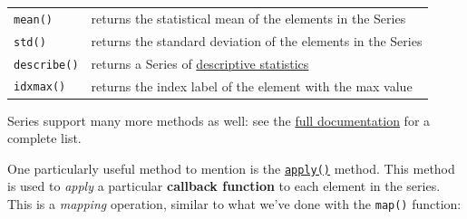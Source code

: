 \documentclass[]{book}
\begin{document}
\begin{longtable}[]{@{}ll@{}}
\begin{minipage}[t]{0.05\columnwidth}
\texttt{mean()}\strut
\end{minipage} & \begin{minipage}[t]{0.05\columnwidth}\raggedright\strut
returns the statistical mean of the elements in the Series\strut
\end{minipage}\tabularnewline
\begin{minipage}[t]{0.05\columnwidth}\raggedright\strut
\texttt{std()}\strut
\end{minipage} & \begin{minipage}[t]{0.05\columnwidth}\raggedright\strut
returns the standard deviation of the elements in the Series\strut
\end{minipage}\tabularnewline
\begin{minipage}[t]{0.05\columnwidth}\raggedright\strut
\texttt{describe()}\strut
\end{minipage} & \begin{minipage}[t]{0.05\columnwidth}\raggedright\strut
returns a Series of
\href{http://pandas.pydata.org/pandas-docs/stable/basics.html\#descriptive-statistics}{descriptive
statistics}\strut
\end{minipage}\tabularnewline
\begin{minipage}[t]{0.05\columnwidth}\raggedright\strut
\texttt{idxmax()}\strut
\end{minipage} & \begin{minipage}[t]{0.05\columnwidth}\raggedright\strut
returns the index label of the element with the max value\strut
\end{minipage}\tabularnewline
\bottomrule
\end{longtable}

Series support many more methods as well: see the
\href{http://pandas.pydata.org/pandas-docs/stable/generated/pandas.Series.html}{full
documentation} for a complete list.

One particularly useful method to mention is the
\href{http://pandas.pydata.org/pandas-docs/stable/generated/pandas.Series.apply.html\#pandas.Series.apply}{\texttt{apply()}}
method. This method is used to \emph{apply} a particular
\textbf{callback function} to each element in the series. This is a
\emph{mapping} operation, similar to what we've done with the
\texttt{map()} function:
\end{document}
